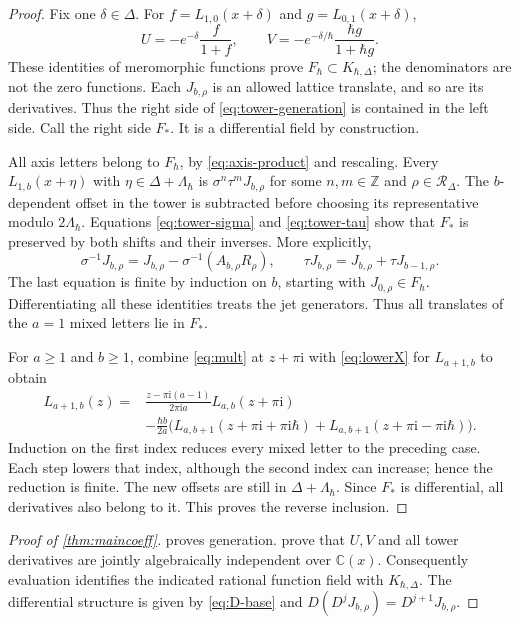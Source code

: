 \documentclass[11pt]{article}
\numberwithin{equation}{section}
\theoremstyle{definition}
\theoremstyle{remark}
\newcommand{\C}{\mathbb C}
\newcommand{\Z}{\mathbb Z}
\newcommand{\ii}{\mathrm i}
\newcommand{\qh}{\hbar}
\begin{document}
\begin{proof}
Fix one $\delta\in\Delta$. For
$f=L_{1,0}(x+\delta)$ and $g=L_{0,1}(x+\delta)$,
\[
 U=-e^{-\delta}\frac{f}{1+f},\qquad
 V=-e^{-\delta/\qh}\frac{\qh g}{1+\qh g}.
\]
These identities of meromorphic functions prove $F_\qh\subset K_{\qh,\Delta}$;
the denominators are not the zero functions. Each $J_{b,\rho}$ is an allowed
lattice translate, and so are its derivatives. Thus the right side of
\eqref{eq:tower-generation} is contained in the left side.
Call the right side $F_*$. It is a differential field by construction.

All axis letters belong to $F_\qh$, by \eqref{eq:axis-product} and rescaling.
Every $L_{1,b}(x+\eta)$ with $\eta\in\Delta+\Lambda_\qh$ is
$\sigma^n\tau^mJ_{b,\rho}$ for some $n,m\in\Z$ and
$\rho\in\mathscr R_\Delta$. The $b$-dependent offset in the tower is
subtracted before choosing its representative modulo $2\Lambda_\qh$.
Equations \eqref{eq:tower-sigma} and \eqref{eq:tower-tau} show that $F_*$ is
preserved by both shifts and their inverses. More explicitly,
\[
 \sigma^{-1}J_{b,\rho}
 =J_{b,\rho}-\sigma^{-1}(A_{b,\rho}R_\rho),\qquad
 \tau J_{b,\rho}=J_{b,\rho}+\tau J_{b-1,\rho}.
\]
The last equation is finite by induction on $b$, starting with
$J_{0,\rho}\in F_\qh$. Differentiating all these identities treats the jet
generators. Thus all translates of the $a=1$ mixed letters lie in $F_*$.

For $a\geq1$ and $b\geq1$, combine \eqref{eq:mult} at $z+\pi\ii$ with
\eqref{eq:lowerX} for $L_{a+1,b}$ to obtain
\begin{equation}\label{eq:reduce-a}
 \begin{split}
 L_{a+1,b}(z)
 ={}&\frac{z-\pi\ii(a-1)}{2\pi\ii a}L_{a,b}(z+\pi\ii)\\
 &-\frac{\qh b}{2a}\bigl(
 L_{a,b+1}(z+\pi\ii+\pi\ii\qh)
 +L_{a,b+1}(z+\pi\ii-\pi\ii\qh)\bigr).
 \end{split}
\end{equation}
Induction on the first index reduces every mixed letter to the preceding
case. Each step lowers that index, although the second index can increase;
hence the reduction is finite. The new offsets are still in
$\Delta+\Lambda_\qh$. Since $F_*$ is differential, all derivatives also
belong to it. This proves the reverse inclusion.
\end{proof}

\begin{proof}[Proof of \cref{thm:maincoeff}]
 proves generation.
 prove that $U,V$ and all tower
derivatives are jointly algebraically independent over $\C(x)$.
Consequently evaluation identifies the indicated rational function field
with $K_{\qh,\Delta}$. The differential structure is given by
\eqref{eq:D-base} and $D(D^jJ_{b,\rho})=D^{j+1}J_{b,\rho}$.
\end{proof}
\end{document}
